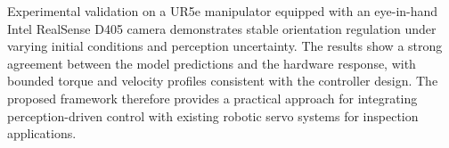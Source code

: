 \documentclass[journal]{IEEEtran}
\begin{document}
Experimental validation on a UR5e manipulator equipped with an eye-in-hand Intel RealSense D405 camera demonstrates stable orientation regulation under varying initial conditions and perception uncertainty. The results show a strong agreement between the model predictions and the hardware response, with bounded torque and velocity profiles consistent with the controller design. The proposed framework therefore provides a practical approach for integrating perception-driven control with existing robotic servo systems for inspection applications.





%





\end{document}

